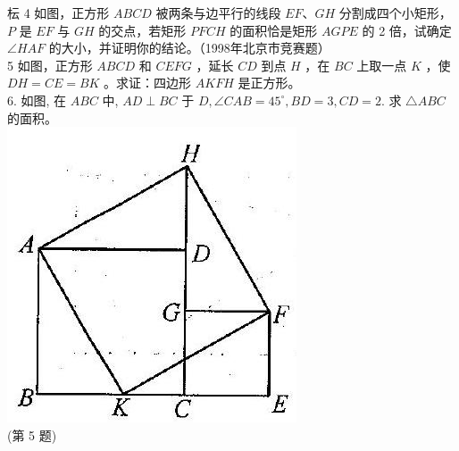 \documentclass[10pt]{article}
\begin{document}
枟 4 如图，正方形 $A B C D$ 被两条与边平行的线段 $E F 、 G H$ 分割成四个小矩形， $P$ 是 $E F$ 与 $G H$ 的交点，若矩形 $P F C H$ 的面积恰是矩形 $A G P E$ 的 2 倍，试确定 $\angle H A F$ 的大小，并证明你的结论。（1998年北京市竞赛题）\\
5 如图，正方形 $A B C D$ 和 $C E F G$ ，延长 $C D$ 到点 $H$ ，在 $B C$ 上取一点 $K$ ，使 $D H=C E=B K$ 。求证：四边形 $A K F H$ 是正方形。\\
6. 如图, 在 $A B C$ 中, $A D \perp B C$ 于 $D, \angle C A B=45^{\circ}, B D=3, C D=2$. 求 $\triangle A B C$ 的面积。\\
\includegraphics[max width=\textwidth, center]{2024_10_30_2c8f45efd4a519b08e1ag-135}\\
(第 5 题)\\
\end{document}
